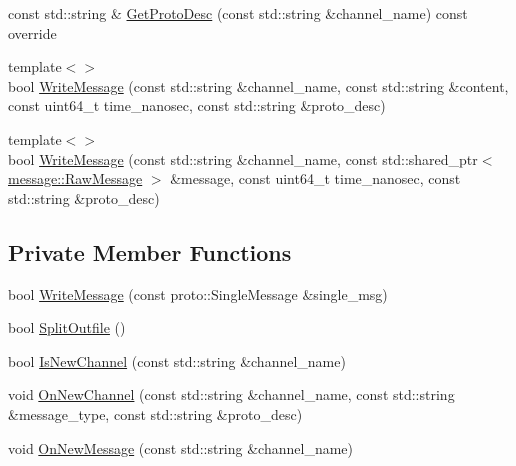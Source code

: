 \begin{DoxyCompactItemize}
\item 
const std\-::string \& \hyperlink{classapollo_1_1cyber_1_1record_1_1RecordWriter_a1f547541dfc6df5803f1032e4f39fb3c}{Get\-Proto\-Desc} (const std\-::string \&channel\-\_\-name) const override
\item 
{\footnotesize template$<$$>$ }\\bool \hyperlink{classapollo_1_1cyber_1_1record_1_1RecordWriter_aafe567af96e0770740544c54d388e4c8}{Write\-Message} (const std\-::string \&channel\-\_\-name, const std\-::string \&content, const uint64\-\_\-t time\-\_\-nanosec, const std\-::string \&proto\-\_\-desc)
\item 
{\footnotesize template$<$$>$ }\\bool \hyperlink{classapollo_1_1cyber_1_1record_1_1RecordWriter_a28694d46c58b507e13571e66ad1b5215}{Write\-Message} (const std\-::string \&channel\-\_\-name, const std\-::shared\-\_\-ptr$<$ \hyperlink{structapollo_1_1cyber_1_1message_1_1RawMessage}{message\-::\-Raw\-Message} $>$ \&message, const uint64\-\_\-t time\-\_\-nanosec, const std\-::string \&proto\-\_\-desc)
\end{DoxyCompactItemize}
\subsection*{Private Member Functions}
\begin{DoxyCompactItemize}
\item 
bool \hyperlink{classapollo_1_1cyber_1_1record_1_1RecordWriter_a0667d7e33d4d062ddbd942753b71c061}{Write\-Message} (const proto\-::\-Single\-Message \&single\-\_\-msg)
\item 
bool \hyperlink{classapollo_1_1cyber_1_1record_1_1RecordWriter_aef5d2cfdfff48cd23f430c0d4a20f5c2}{Split\-Outfile} ()
\item 
bool \hyperlink{classapollo_1_1cyber_1_1record_1_1RecordWriter_a2ea4f80202e28292900382ca60ec9b71}{Is\-New\-Channel} (const std\-::string \&channel\-\_\-name)
\item 
void \hyperlink{classapollo_1_1cyber_1_1record_1_1RecordWriter_a96843b877960edcf89da30a5ea0807d2}{On\-New\-Channel} (const std\-::string \&channel\-\_\-name, const std\-::string \&message\-\_\-type, const std\-::string \&proto\-\_\-desc)
\item 
void \hyperlink{classapollo_1_1cyber_1_1record_1_1RecordWriter_aa997a88b0c59f25f8f5b52aab1c76229}{On\-New\-Message} (const std\-::string \&channel\-\_\-name)
\end{DoxyCompactItemize}
